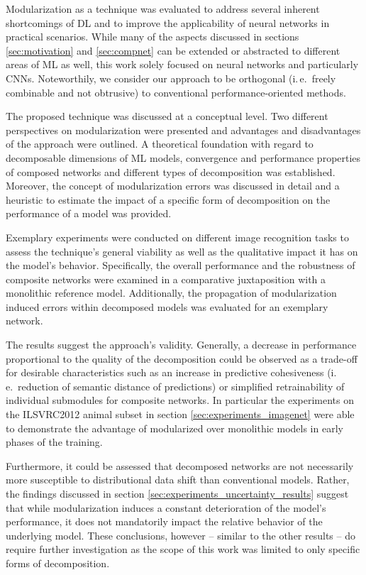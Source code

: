 Modularization as a technique was evaluated to address several inherent shortcomings of DL and to improve the applicability of neural networks in practical scenarios. While many of the aspects discussed in sections \ref{sec:motivation} and \ref{sec:compnet} can be extended or abstracted to different areas of ML as well, this work solely focused on neural networks and particularly CNNs. Noteworthily, we consider our approach to be orthogonal (i.\,e.\ freely combinable and not obtrusive) to conventional performance-oriented methods.

The proposed technique was discussed at a conceptual level. Two different perspectives on modularization were presented and advantages and disadvantages of the approach were outlined. A theoretical foundation with regard to decomposable dimensions of ML models, convergence and performance properties of composed networks and different types of decomposition was established. Moreover, the concept of modularization errors was discussed in detail and a heuristic to estimate the impact of a specific form of decomposition on the performance of a model was provided.   

Exemplary experiments were conducted on different image recognition tasks to assess the technique's general viability as well as the qualitative impact it has on the model's behavior. Specifically, the overall performance and the robustness of composite networks were examined in a comparative juxtaposition with a monolithic reference model. Additionally, the propagation of modularization induced errors within decomposed models was evaluated for an exemplary network.

The results suggest the approach's validity. Generally, a decrease in performance proportional to the quality of the decomposition could be observed as a trade-off for desirable characteristics such as an increase in predictive cohesiveness (i.\,e.\ reduction of semantic distance of predictions) or simplified retrainability of individual submodules for composite networks. In particular the experiments on the ILSVRC2012 animal subset in section \ref{sec:experiments_imagenet} were able to demonstrate the advantage of modularized over monolithic models in early phases of the training.

Furthermore, it could be assessed that decomposed networks are not necessarily more susceptible to distributional data shift than conventional models. Rather, the findings discussed in section \ref{sec:experiments_uncertainty_results} suggest that while modularization induces a constant deterioration of the model's performance, it does not mandatorily impact the relative behavior of the underlying model. These conclusions, however -- similar to the other results -- do require further investigation as the scope of this work was limited to only specific forms of decomposition.

